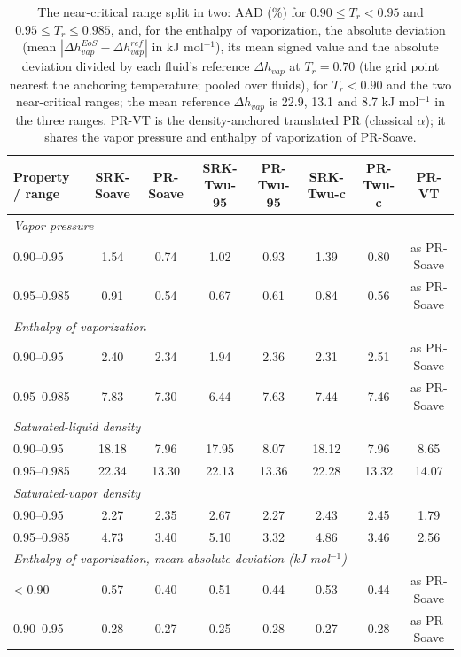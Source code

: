 \begin{table}[H]
\centering
\caption{The near-critical range split in two: AAD (\%) for $0.90 \le T_r < 0.95$ and $0.95 \le T_r \le 0.985$, and, for the enthalpy of vaporization, the absolute deviation (mean $|\Delta h_{vap}^{EoS} - \Delta h_{vap}^{ref}|$ in kJ mol$^{-1}$), its mean signed value and the absolute deviation divided by each fluid's reference $\Delta h_{vap}$ at $T_r = 0.70$ (the grid point nearest the anchoring temperature; pooled over fluids), for $T_r < 0.90$ and the two near-critical ranges; the mean reference $\Delta h_{vap}$ is 22.9, 13.1 and 8.7 kJ mol$^{-1}$ in the three ranges. PR-VT is the density-anchored translated PR (classical $\alpha$); it shares the vapor pressure and enthalpy of vaporization of PR-Soave.}
\label{tab:tabS_nearcrit}
\small
\begin{tabular}{lccccccc}
\toprule
Property / range & SRK-Soave & PR-Soave & SRK-Twu-95 & PR-Twu-95 & SRK-Twu-c & PR-Twu-c & PR-VT \\
\midrule
\multicolumn{8}{l}{\emph{Vapor pressure}} \\
0.90–0.95 & 1.54 & 0.74 & 1.02 & 0.93 & 1.39 & 0.80 & as PR-Soave \\
0.95–0.985 & 0.91 & 0.54 & 0.67 & 0.61 & 0.84 & 0.56 & as PR-Soave \\
\multicolumn{8}{l}{\emph{Enthalpy of vaporization}} \\
0.90–0.95 & 2.40 & 2.34 & 1.94 & 2.36 & 2.31 & 2.51 & as PR-Soave \\
0.95–0.985 & 7.83 & 7.30 & 6.44 & 7.63 & 7.44 & 7.46 & as PR-Soave \\
\multicolumn{8}{l}{\emph{Saturated-liquid density}} \\
0.90–0.95 & 18.18 & 7.96 & 17.95 & 8.07 & 18.12 & 7.96 & 8.65 \\
0.95–0.985 & 22.34 & 13.30 & 22.13 & 13.36 & 22.28 & 13.32 & 14.07 \\
\multicolumn{8}{l}{\emph{Saturated-vapor density}} \\
0.90–0.95 & 2.27 & 2.35 & 2.67 & 2.27 & 2.43 & 2.45 & 1.79 \\
0.95–0.985 & 4.73 & 3.40 & 5.10 & 3.32 & 4.86 & 3.46 & 2.56 \\
\multicolumn{8}{l}{\emph{Enthalpy of vaporization, mean absolute deviation (kJ mol$^{-1}$)}} \\
< 0.90 & 0.57 & 0.40 & 0.51 & 0.44 & 0.53 & 0.44 & as PR-Soave \\
0.90–0.95 & 0.28 & 0.27 & 0.25 & 0.28 & 0.27 & 0.28 & as PR-Soave \\

\end{tabular}
\end{table}
